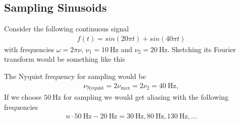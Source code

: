 \documentclass[a4paper]{article}
\begin{document}
\subsection{Sampling Sinusoids}
Consider the following continuous signal
\begin{align}
    f(t) = sin(20\pi t) + sin(40\pi t)
\end{align}
with frequencies $\omega = 2\pi \nu$, $\nu_1 = 10\ \text{Hz}$ and $\nu_2 = 20\
\text{Hz}$. Sketching its Fourier transform would be something like this
\begin{figure}[H]
    \centering
{}
\end{figure}
The Nyquist frequency for sampling would be
\begin{align}
    \nu_{\text{Nyquist}} = 2\nu_\text{max} = 2\nu_2 = 40\ \text{Hz},
\end{align}
If we choose $50\ \text{Hz}$ for sampling we would get aliasing with the
following frequencies
\begin{align}
    n \cdot 50\ \text{Hz} - 20\ \text{Hz} = 30\ \text{Hz},80\ \text{Hz}, 130\
    \text{Hz}, \dots
\end{align}
\end{document}
